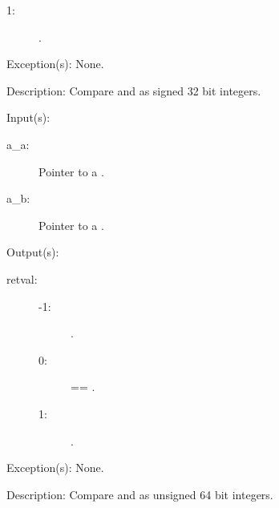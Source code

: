 \begin{capi}
\begin{capilist}
\begin{description}
\begin{description}
			\item[1: ]  {\gt} .
			\end{description}
		\end{description}
	\item[Exception(s): ] None.
	\item[Description: ]
		Compare  and  as signed 32 bit
		integers.
	\end{capilist}
\label{bhp_priority_compare_uint64}
	\begin{capilist}
	\item[Input(s): ]
		\begin{description}\item[]
		\item[a\_a: ]
			Pointer to a .
		\item[a\_b: ]
			Pointer to a .
		\end{description}
	\item[Output(s): ]
		\begin{description}\item[]
		\item[retval: ]
			\begin{description}\item[]
			\item[-1: ]  {\lt} .
			\item[0: ]  == .
			\item[1: ]  {\gt} .
			\end{description}
		\end{description}
	\item[Exception(s): ] None.
	\item[Description: ]
		Compare  and  as unsigned 64 bit
		integers.
	\end{capilist}
\end{capi}

